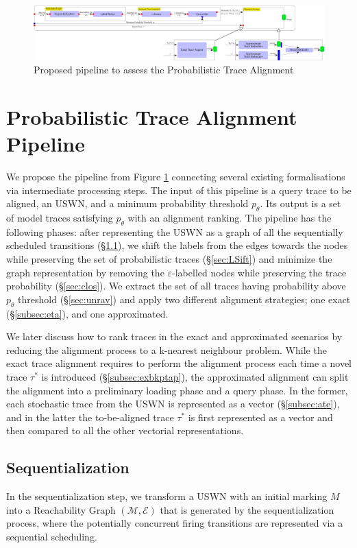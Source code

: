 
\begin{figure}[!t]
	\hspace*{-4cm}\includegraphics[width=1.7\textwidth]{images/pipeline}
	\caption{Proposed pipeline to assess the Probabilistic Trace Alignment}\label{fig:pipe}
\end{figure}


\section{Probabilistic Trace Alignment Pipeline}
We propose the pipeline from Figure \ref{fig:pipe} connecting several existing formalisations via intermediate processing steps. 
The input of this pipeline is a query trace to be aligned, an USWN, and a minimum probability threshold $p_\theta$. Its output 
is a set of model traces satisfying $p_\theta$ with an alignment ranking.
%
The pipeline has the following phases: after representing the USWN as a graph of all the sequentially scheduled transitions 
(\S\ref{sec:seqZ}), we shift the labels from the edges towards the nodes while preserving the set of probabilistic traces 
(\S\ref{sec:LSift}) and minimize the graph representation by removing the $\varepsilon$-labelled nodes while preserving the 
trace probability (\S\ref{sec:clos}). We extract the set of all traces having probability above $p_\theta$ threshold (\S\ref{sec:unrav}) and  apply two different alignment strategies; one exact  (\S\ref{subsec:eta}), and one approximated. 


We later discuss how to rank traces in the exact and approximated scenarios by reducing the alignment process to a k-nearest 
neighbour problem. While the exact trace alignment requires to perform the alignment process each time a novel trace $\tau^*$ is 
introduced (\S\ref{subsec:exbkptap}), the approximated alignment can split the alignment into a preliminary loading phase and a 
query phase. In the former, each stochastic trace from the USWN is represented as a vector (\S\ref{subsec:ate}), and in the latter the to-be-aligned trace $\tau^*$ is first represented as a vector and then compared to all the other vectorial representations.  

\subsection{Sequentialization}\label{sec:seqZ}
In the sequentialization step, we transform a USWN with an initial marking $M$ into a Reachability Graph $(\mathcal{M},\mathcal{E})$ that is generated by the sequentialization process, where the potentially concurrent firing transitions are represented via a sequential scheduling. 

